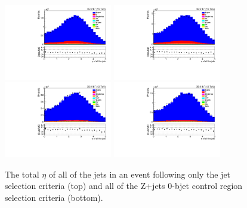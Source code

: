\begin{figure}[ht]
\centering
\includegraphics[width=0.42\textwidth]{figs/background-estimation/plots/unblinded/DY_control_old_prompt_ee_DYamcatnlo/totalJetEta_SingleTop_jetSel_ee.pdf}
\includegraphics[width=0.42\textwidth]{figs/background-estimation/plots/unblinded/DY_control_old_prompt_mumu_DYamcatnlo/totalJetEta_SingleTop_jetSel_mumu.pdf}
\\
\includegraphics[width=0.42\textwidth]{figs/background-estimation/plots/unblinded/DY_control_old_prompt_ee_DYamcatnlo/totalJetEta_SingleTop_wMass_ee.pdf}
\includegraphics[width=0.42\textwidth]{figs/background-estimation/plots/unblinded/DY_control_old_prompt_mumu_DYamcatnlo/totalJetEta_SingleTop_wMass_mumu.pdf}
\caption{
The total $\eta$ of all of the jets in an event following only the jet selection criteria (top) and all of the Z+jets 0-bjet control region selection criteria (bottom).
}
\label{fig:CR_NLO_totalJetEta}
\end{figure}


